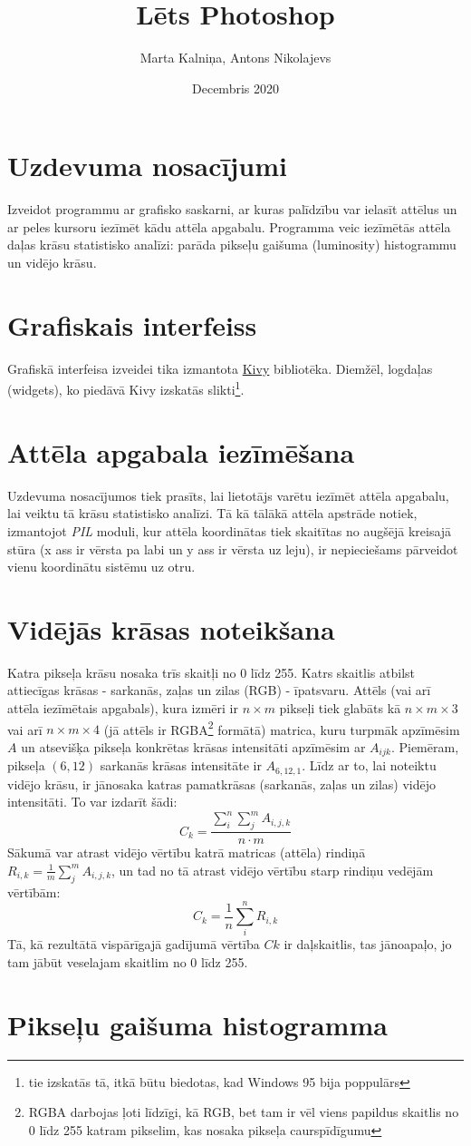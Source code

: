 \documentclass{article}
\title{Lēts Photoshop}
\author{Marta Kalniņa, Antons Nikolajevs }
\date{Decembris 2020}
\begin{document}
\maketitle

\section{Uzdevuma nosacījumi}
Izveidot programmu ar grafisko saskarni, ar kuras palīdzību var ielasīt attēlus un ar peles kursoru iezīmēt kādu attēla apgabalu. Programma veic iezīmētās attēla daļas krāsu statistisko analīzi: parāda pikseļu gaišuma (luminosity) histogrammu un vidējo krāsu.
\section{Grafiskais interfeiss}
Grafiskā interfeisa izveidei tika izmantota \href{https://kivy.org/#home}{Kivy} bibliotēka. Diemžēl, logdaļas (widgets), ko piedāvā Kivy izskatās slikti\footnote{tie izskatās tā, itkā būtu biedotas, kad Windows 95 bija poppulārs}.

\section{Attēla apgabala iezīmēšana}
Uzdevuma nosacījumos tiek prasīts, lai lietotājs varētu iezīmēt attēla apgabalu, lai veiktu tā krāsu statistisko analīzi.
Tā kā tālākā attēla apstrāde notiek, izmantojot \textit{PIL} moduli, kur attēla koordinātas tiek skaitītas no augšējā kreisajā stūra (x ass ir vērsta pa labi un y ass ir vērsta uz leju), ir nepieciešams pārveidot vienu koordinātu sistēmu uz otru.

\section{Vidējās krāsas noteikšana}

Katra pikseļa krāsu nosaka trīs skaitļi no 0 līdz 255. Katrs skaitlis atbilst attiecīgas krāsas - sarkanās, zaļas un zilas (RGB) - īpatsvaru. Attēls (vai arī attēla iezīmētais apgabals), kura izmēri ir $n\times m$ pikseļi tiek glabāts kā $n\times m \times 3$ vai arī $n \times m \times 4$ (jā attēls ir RGBA\footnote{RGBA darbojas ļoti līdzīgi, kā RGB, bet tam ir vēl viens papildus skaitlis no 0 līdz 255 katram pikselim, kas nosaka pikseļa caurspīdīgumu} formātā) matrica, kuru turpmāk apzīmēsim $A$ un atsevišķa pikseļa konkrētas krāsas intensitāti apzīmēsim ar $A_{ijk}$. Piemēram, pikseļa $(6, 12)$ sarkanās krāsas intensitāte ir $A_{6,12,1}$. Līdz ar to, lai noteiktu vidējo krāsu, ir jānosaka katras pamatkrāsas (sarkanās, zaļas un zilas) vidējo intensitāti. To var izdarīt šādi:
$$
    C_{k} = \frac{\sum_i^n \sum_j^m A_{i,j,k}}{n\cdot m}
$$
Sākumā var atrast vidējo vērtību katrā matricas (attēla) rindiņā $ R_{i,k} = \frac{1}{m}\sum_j^m A_{i,j,k}$, un tad no tā atrast vidējo vērtību starp rindiņu vedējām vērtībām:
$$
    C_{k} = \frac{1}{n}\sum_i^n R_{i,k}
$$
Tā, kā rezultātā vispārīgajā gadījumā vērtība $C{k}$ ir daļskaitlis, tas jānoapaļo, jo tam jābūt veselajam skaitlim no 0 līdz 255.
\section{Pikseļu gaišuma histogramma}
\end{document}
